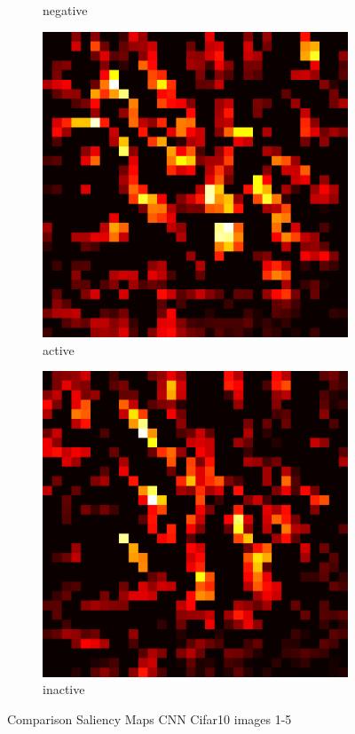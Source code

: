 \documentclass[preprint,12pt]{elsarticle}
\begin{document}
\begin{figure}
\begin{subfigure}{0.14\textwidth}
        \caption{negative}
    \end{subfigure}
    \hfill
    \begin{subfigure}{0.14\textwidth}
        \centering
        \includegraphics[width=\linewidth]{../visualizations/examples/cifar10/cnn/active_saliency_map/4.png}
        \caption{active}
    \end{subfigure}
    \hfill
    \begin{subfigure}{0.14\textwidth}
        \centering
        \includegraphics[width=\linewidth]{../visualizations/examples/cifar10/cnn/inactive_saliency_map/4.png}
        \caption{inactive}
    \end{subfigure}
    \hfill
    \caption{Comparison Saliency Maps CNN Cifar10 images 1-5}
\end{figure}
\end{document}
